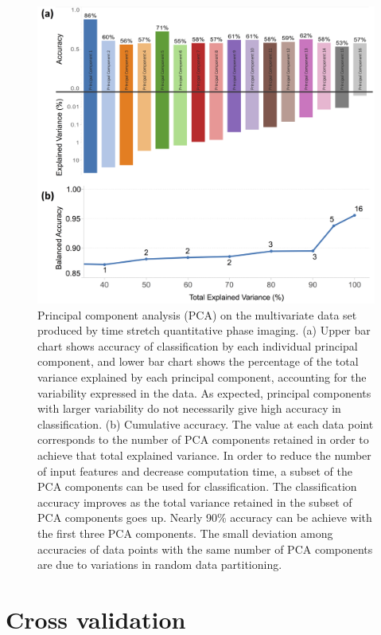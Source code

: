 \documentclass[aps,pra,reprint,longbibliography,groupedaddress]{revtex4-1}
\begin{document}
\begin{figure}
\includegraphics[scale=0.1]{FigurePCA.jpg}
\caption{\label{fig:PCA} 
Principal component analysis (PCA) on the multivariate data set produced by time stretch quantitative phase imaging. (a) Upper bar chart shows accuracy of classification by each individual principal component, and lower bar chart shows the percentage of the total variance explained by each principal component, accounting for the variability expressed in the data. As expected, principal components with larger variability do not necessarily give high accuracy in classification. (b) Cumulative accuracy. The value at each data point corresponds to the number of PCA components retained in order to achieve that total explained variance. In order to reduce the number of input features and decrease computation time, a subset of the PCA components can be used for classification. The classification accuracy improves as the total variance retained in the subset of PCA components goes up. Nearly 90\% accuracy can be achieve with the first three PCA components. The small deviation among accuracies of data points with the same number of PCA components are due to variations in random data partitioning.}
\end{figure}

\section*{\label{scn:CrossValidation}Cross validation} 
\end{document}
